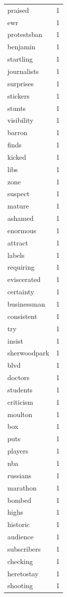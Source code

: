 \begin{tabular}{lr}
praised & 1 \\
ewr & 1 \\
protestsban & 1 \\
benjamin & 1 \\
startling & 1 \\
journalists & 1 \\
surprises & 1 \\
stickers & 1 \\
stunts & 1 \\
visibility & 1 \\
barron & 1 \\
finds & 1 \\
kicked & 1 \\
libs & 1 \\
zone & 1 \\
suspect & 1 \\
mature & 1 \\
ashamed & 1 \\
enormous & 1 \\
attract & 1 \\
labels & 1 \\
requiring & 1 \\
eviscerated & 1 \\
certainty & 1 \\
businessman & 1 \\
consistent & 1 \\
try & 1 \\
insist & 1 \\
sherwoodpark & 1 \\
blvd & 1 \\
doctors & 1 \\
students & 1 \\
criticism & 1 \\
moulton & 1 \\
box & 1 \\
puts & 1 \\
players & 1 \\
nba & 1 \\
russians & 1 \\
marathon & 1 \\
bombed & 1 \\
highs & 1 \\
historic & 1 \\
audience & 1 \\
subscribers & 1 \\
checking & 1 \\
heretostay & 1 \\
shooting & 1 \\

\end{tabular}
